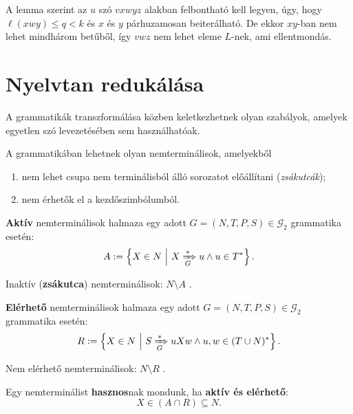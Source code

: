 A lemma szerint az $u$ szó $vxwyz$ alakban felbontható kell legyen, úgy, hogy $\ell(xwy) \leq q <k$ és $x$ és $y$ párhuzamosan beiterálható. De ekkor $xy$-ban nem lehet mindhárom betűből, így $vwz$ nem
lehet eleme $L$-nek, ami ellentmondás.

\section{Nyelvtan redukálása}

A grammatikák transzformálása közben keletkezhetnek olyan szabályok, amelyek egyetlen szó levezetésében sem használhatóak.

A grammatikában lehetnek olyan nemterminálisok, amelyekből

\begin{enumerate}
	\item nem lehet csupa nem terminálisból álló sorozatot
	előállítani (\textit{zsákutcák});
	\item nem érhetők el a kezdőszimbólumból.
\end{enumerate}

\begin{tcolorbox}
	\begin{definition}	
		\textbf{Aktív} nemterminálisok halmaza egy adott $G=(N,T,P,S)\in \mathcal{G}_2$ grammatika esetén:
		\[ A := \left\{ X \in N ~ \middle\vert ~ X \xRightarrow[{G}]{*} u \land u \in T^* \right\}. \] 
	\end{definition}
\end{tcolorbox}

Inaktív (\textbf{zsákutca}) nemterminálisok: $\boxed{N \setminus A}$ .

\begin{tcolorbox}
	\begin{definition}	
		\textbf{Elérhető} nemterminálisok halmaza egy adott $G=(N,T,P,S)\in \mathcal{G}_2$ grammatika esetén:
		\[ R := \left\{ X \in N ~ \middle\vert ~ S \xRightarrow[{G}]{*} uXw \land u, w \in (T \cup N)^* \right\}. \] 
	\end{definition}
\end{tcolorbox}

Nem elérhető nemterminálisok: $\boxed{N \setminus R}$ .

\begin{tcolorbox}
	\begin{definition}	
		Egy nemterminálist \textbf{hasznos}nak mondunk, ha \textbf{aktív és elérhető}:
		\[ X \in (A \cap R) \subseteq N. \]
	\end{definition}
\end{tcolorbox}

